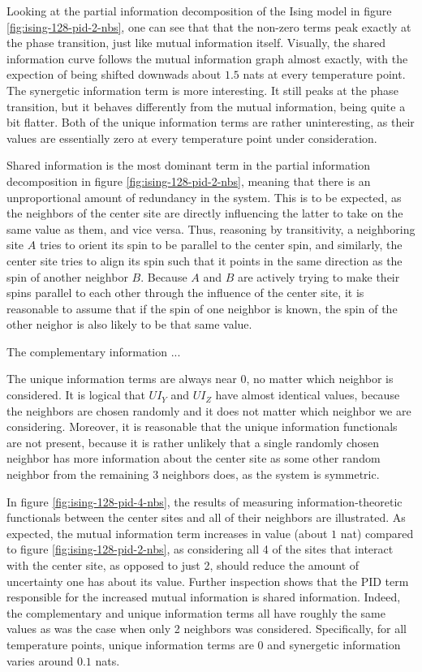 \documentclass[12pt]{article}
\begin{document}
Looking at the partial information decomposition of the Ising model in figure \ref{fig:ising-128-pid-2-nbs}, one can see that that the non-zero terms peak exactly at the phase transition, just like mutual information itself. Visually, the shared information curve follows the mutual information graph almost exactly, with the expection of being shifted downwads about $1.5$ nats at every temperature point. The synergetic information term is more interesting. It still peaks at the phase transition, but it behaves differently from the mutual information, being quite a bit flatter. Both of the unique information terms are rather uninteresting, as their values are essentially zero at every temperature point under consideration. 

Shared information is the most dominant term in the partial information decomposition in figure \ref{fig:ising-128-pid-2-nbs}, meaning that there is an unproportional amount of redundancy in the system. This is to be expected, as the neighbors of the center site are directly influencing the latter to take on the same value as them, and vice versa. Thus, reasoning by transitivity, a neighboring site $A$ tries to orient its spin to be parallel to the center spin, and similarly, the center site tries to align its spin such that it points in the same direction as the spin of another neighbor $B$. Because $A$ and $B$ are actively trying to make their spins parallel to each other through the influence of the center site, it is reasonable to assume that if the spin of one neighbor is known, the spin of the other neighor is also likely to be that same value. 

The complementary information ...  

The unique information terms are always near 0, no matter which neighbor is considered. It is logical that $UI_Y$ and $UI_Z$ have almost identical values, because the neighbors are chosen randomly and it does not matter which neighbor we are considering. Moreover, it is reasonable that the unique information functionals are not present, because it is rather unlikely that a single randomly chosen neighbor has more information about the center site as some other random neighbor from the remaining 3 neighbors does, as the system is symmetric.

In figure \ref{fig:ising-128-pid-4-nbs}, the results of measuring information-theoretic functionals between the center sites and all of their neighbors are illustrated. As expected, the mutual information term increases in value (about $1$ nat) compared to figure \ref{fig:ising-128-pid-2-nbs}, as considering all 4 of the sites that interact with the center site, as opposed to just 2, should reduce the amount of uncertainty one has about its value. Further inspection shows that the PID term responsible for the increased mutual information is shared information. Indeed, the complementary and unique information terms all have roughly the same values as was the case when only 2 neighbors was considered. Specifically, for all temperature points, unique information terms are $0$ and synergetic information varies around $0.1$ nats. 
\end{document}
